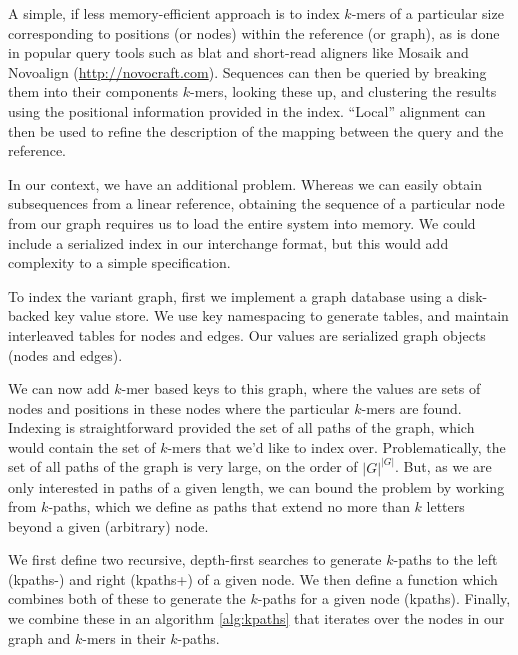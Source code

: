 \documentclass{article}
\begin{document}
A simple, if less memory-efficient approach is to index $k$-mers of a particular size corresponding to positions (or nodes) within the reference (or graph), as is done in popular query tools such as blat \cite{kent2002blat} and short-read aligners like Mosaik \cite{lee2014mosaik} and Novoalign (\url{http://novocraft.com}).
Sequences can then be queried by breaking them into their components $k$-mers, looking these up, and clustering the results using the positional information provided in the index.
``Local'' alignment can then be used to refine the description of the mapping between the query and the reference.

In our context, we have an additional problem. Whereas we can easily obtain subsequences from a linear reference, obtaining the sequence of a particular node from our graph requires us to load the entire system into memory. We could include a serialized index in our interchange format, but this would add complexity to a simple specification.

To index the variant graph, first we implement a graph database using a disk-backed key value store. We use key namespacing to generate tables, and maintain interleaved tables for nodes and edges. Our values are serialized graph objects (nodes and edges).

We can now add $k$-mer based keys to this graph, where the values are sets of nodes and positions in these nodes where the particular $k$-mers are found.
Indexing is straightforward provided the set of all paths of the graph, which would contain the set of $k$-mers that we'd like to index over. Problematically, the set of all paths of the graph is very large, on the order of $|G|^{|G|}$. But, as we are only interested in paths of a given length, we can bound the problem by working from $k$-paths, which we define as paths that extend no more than $k$ letters beyond a given (arbitrary) node.

We first define two recursive, depth-first searches to generate $k$-paths to the left (kpaths-) and right (kpaths+) of a given node. We then define a function which combines both of these to generate the $k$-paths for a given node (kpaths).
Finally, we combine these in an algorithm \ref{alg:kpaths} that iterates over the nodes in our graph and $k$-mers in their $k$-paths.
\end{document}
